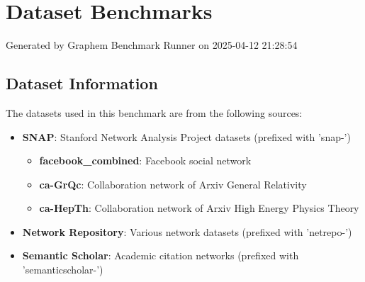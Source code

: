 \documentclass{article}
\begin{document}
\section*{Dataset Benchmarks}
Generated by Graphem Benchmark Runner on 2025-04-12 21:28:54
\subsection*{Dataset Information}
The datasets used in this benchmark are from the following sources:
\begin{itemize}
\item \textbf{SNAP}: Stanford Network Analysis Project datasets (prefixed with 'snap-')
  \begin{itemize}
  \item \textbf{facebook\_combined}: Facebook social network
  \item \textbf{ca-GrQc}: Collaboration network of Arxiv General Relativity
  \item \textbf{ca-HepTh}: Collaboration network of Arxiv High Energy Physics Theory
  \end{itemize}
\item \textbf{Network Repository}: Various network datasets (prefixed with 'netrepo-')
\item \textbf{Semantic Scholar}: Academic citation networks (prefixed with 'semanticscholar-')
\end{itemize}
\end{document}
